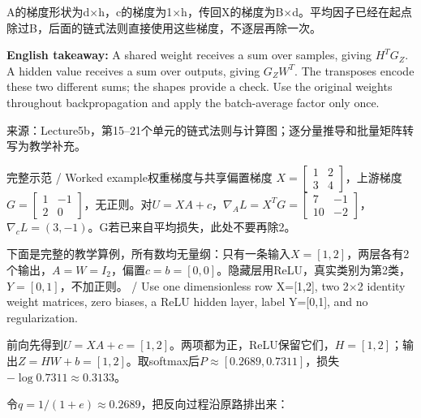 A的梯度形状为d\ensuremath{\times}h，c的梯度为1\ensuremath{\times}h，传回X的梯度为B\ensuremath{\times}d。平均因子已经在起点除过B，后面的链式法则直接使用这些梯度，不逐层再除一次。


\textbf{English takeaway:} A shared weight receives a sum over samples, giving \(H^TG_Z\). A hidden value receives a sum over outputs, giving \(G_ZW^T\). The transposes encode these two different sums; the shapes provide a check. Use the original weights throughout backpropagation and apply the batch-average factor only once.


来源：Lecture5b，第15–21个单元的链式法则与计算图；逐分量推导和批量矩阵转写为教学补充。


\begin{StudyBlock}{完整示范 / Worked example}{权重梯度与共享偏置梯度}
\(X=\begin{bmatrix}1&2\\3&4\end{bmatrix}\)，上游梯度 \(G=\begin{bmatrix}1&-1\\2&0\end{bmatrix}\)，无正则。对\(U=XA+c\)，\(\nabla_A L=X^TG=\begin{bmatrix}7&-1\\10&-2\end{bmatrix}\)，\(\nabla_cL=(3,-1)\)。G若已来自平均损失，此处不要再除2。
\end{StudyBlock}








下面是完整的教学算例，所有数均无量纲：只有一条输入\(X=[1,2]\)，两层各有2个输出，\(A=W=I_2\)，偏置\(c=b=[0,0]\)。隐藏层用ReLU，真实类别为第2类，\(Y=[0,1]\)，不加正则。 / Use one dimensionless row X=[1,2], two 2\ensuremath{\times}2 identity weight matrices, zero biases, a ReLU hidden layer, label Y=[0,1], and no regularization.


前向先得到\(U=XA+c=[1,2]\)。两项都为正，ReLU保留它们，\(H=[1,2]\)；输出\(Z=HW+b=[1,2]\)。取softmax后\(P\approx[0.2689,0.7311]\)，损失\(-\log0.7311\approx0.3133\)。


令\(q=1/(1+e)\approx0.2689\)，把反向过程沿原路排出来：


